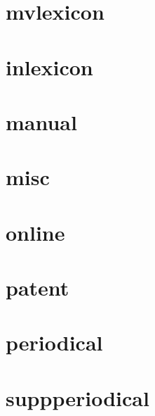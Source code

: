 \documentclass{article}
\begin{document}
\cite[1]{lexicon}

\cite[1]{lexicon}

\section{mvlexicon}

\cite[1]{mvlexicon}

\cite[1]{mvlexicon}

\section{inlexicon}

\cite[1]{inlexicon}

\cite[1]{inlexicon}

\section{manual}

\cite[1]{manual}

\cite[1]{manual}

\section{misc}

\cite[1]{misc}

\cite[1]{misc}

\section{online}

\cite[1]{online}

\cite[1]{online}

\section{patent}

\cite[1]{patent}

\cite[1]{patent}

\section{periodical}

\cite[1]{periodical}

\cite[1]{periodical}

\section{suppperiodical}
\end{document}
